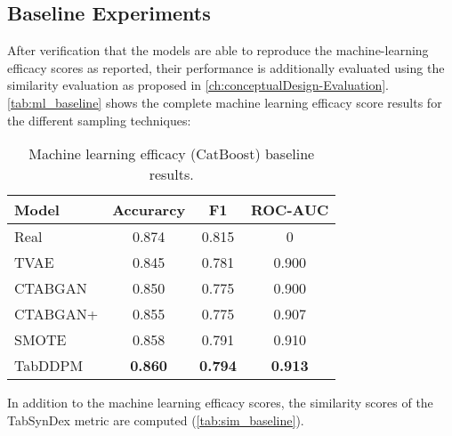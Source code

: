 
\subsection[]{Baseline Experiments}
\label{ch:Baseline}

After verification that the models are able to reproduce the machine-learning efficacy scores as reported,
their performance is additionally evaluated using the similarity evaluation as proposed in \autoref{ch:conceptualDesign-Evaluation}.
\autoref{tab:ml_baseline} shows the complete machine learning efficacy score results for the different sampling techniques:

\begin{table}[h]
	\centering
	\begin{tabular}{l|c|c|c}
		\hline
		\textbf{Model} & \textbf{Accurarcy} & \textbf{F1}    & \textbf{ROC-AUC} \\ \hline
		Real           & 0.874              & 0.815          & 0                \\ \hline
		TVAE           & 0.845              & 0.781          & 0.900            \\ \hline
		CTABGAN        & 0.850              & 0.775          & 0.900            \\ \hline
		CTABGAN+       & 0.855              & 0.775          & 0.907            \\ \hline
		SMOTE          & 0.858              & 0.791          & 0.910            \\ \hline
		TabDDPM        & \textbf{0.860}     & \textbf{0.794} & \textbf{0.913}   \\ \hline
	\end{tabular}
	\caption[Machine learning efficacy baseline]{Machine learning efficacy (CatBoost) baseline results.}
	\label{tab:ml_baseline}
\end{table}


In addition to the machine learning efficacy scores, the similarity scores of the TabSynDex metric are computed (\autoref{tab:sim_baseline}).


